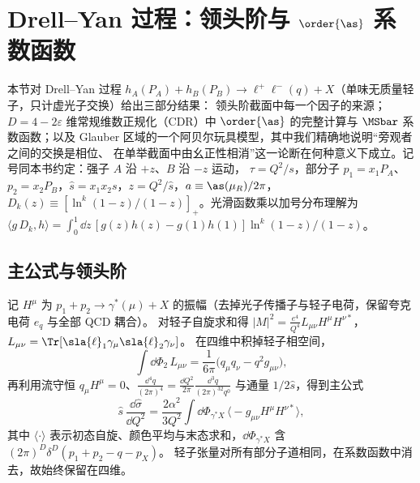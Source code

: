 \section{Drell--Yan 过程：领头阶与 \texorpdfstring{$\order{\as}$}{O(αs)} 系数函数}
\label{sec:dy1l}

本节对 Drell--Yan 过程 $h_A(P_A)+h_B(P_B)\to\ell^+\ell^-(q)+X$（单味无质量轻子，只计虚光子交换）给出三部分结果：
领头阶截面中每一个因子的来源；$D=4-2\varepsilon$ 维常规维数正规化（CDR）中 $\order{\as}$ 的完整计算与
$\MSbar$ 系数函数；以及 Glauber 区域的一个阿贝尔玩具模型，其中我们精确地说明“旁观者之间的交换是相位、
在单举截面中由幺正性相消”这一论断在何种意义下成立。记号同本书约定：强子 $A$ 沿 $+z$、$B$ 沿 $-z$ 运动，
$\tau=Q^2/s$，部分子 $p_1=x_1P_A$、$p_2=x_2P_B$，$\hat s=x_1x_2s$，$z=Q^2/\hat s$，$a\equiv\as(\mu_R)/2\pi$，
$D_k(z)\equiv[\ln^k(1-z)/(1-z)]_+$。光滑函数乘以加号分布理解为
$\langle g\,D_k,h\rangle=\int_0^1\dd z\,[g(z)h(z)-g(1)h(1)]\ln^k(1-z)/(1-z)$。

\subsection{主公式与领头阶}
\label{sec:dy1l-lo}

记 $H^\mu$ 为 $p_1+p_2\to\gamma^*(\mu)+X$ 的振幅（去掉光子传播子与轻子电荷，保留夸克电荷 $e_q$ 与全部 QCD 耦合）。
对轻子自旋求和得 $|M|^2=\frac{e^4}{Q^4}L_{\mu\nu}H^\mu H^{\nu*}$，$L_{\mu\nu}=\Tr[\sla{\ell}_1\gamma_\mu\sla{\ell}_2\gamma_\nu]$。
在四维中积掉轻子相空间，
\begin{equation}\label{eq:dy1l-lep}
\int\dd\Phi_2\,L_{\mu\nu}=\frac{1}{6\pi}\big(q_\mu q_\nu-q^2g_{\mu\nu}\big),
\end{equation}
再利用流守恒 $q_\mu H^\mu=0$、$\frac{\dd^4q}{(2\pi)^4}=\frac{\dd Q^2}{2\pi}\frac{\dd^3q}{(2\pi)^32q^0}$ 与通量 $1/2\hat s$，得到主公式
\begin{equation}\label{eq:dy1l-master}
\hat s\,\frac{\dd\hat\sigma}{\dd Q^2}=\frac{2\alpha^2}{3Q^2}\int\dd\Phi_{\gamma^*X}\,\big\langle-g_{\mu\nu}H^\mu H^{\nu*}\big\rangle ,
\end{equation}
其中 $\langle\cdot\rangle$ 表示初态自旋、颜色平均与末态求和，$\dd\Phi_{\gamma^*X}$ 含 $(2\pi)^D\delta^D(p_1+p_2-q-p_X)$。
轻子张量对所有部分子道相同，在系数函数中消去，故始终保留在四维。

